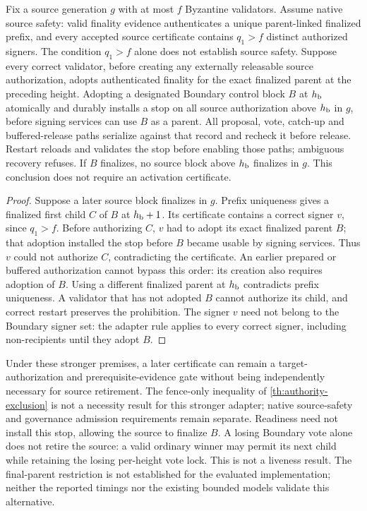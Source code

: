 \begin{proposition}
\label{prop:final-parent-retirement}
Fix a source generation $g$ with at most $f$ Byzantine validators. Assume native source safety:
valid finality evidence authenticates a unique parent-linked finalized prefix, and every accepted
source certificate contains $q_1>f$ distinct authorized signers. The condition $q_1>f$ alone does not establish source safety.
Suppose every correct validator, before creating any externally releasable source authorization,
adopts authenticated finality for the exact finalized parent at the preceding height.
Adopting a designated Boundary control block $B$ at $h_{\mathrm b}$ atomically and durably installs a stop on
all source authorization above $h_{\mathrm b}$ in $g$, before signing services can use $B$ as a parent.
All proposal, vote, catch-up and buffered-release paths serialize against that record and recheck
it before release. Restart reloads and validates the stop before enabling those paths; ambiguous
recovery refuses. If $B$ finalizes, no source block above $h_{\mathrm b}$ finalizes in $g$.
This conclusion does not require an activation certificate.
\end{proposition}
\begin{proof}
Suppose a later source block finalizes in $g$. Prefix uniqueness gives a finalized first child
$C$ of $B$ at $h_{\mathrm b}+1$. Its certificate contains a correct signer $v$, since $q_1>f$.
Before authorizing $C$, $v$ had to adopt its exact finalized parent $B$; that adoption installed
the stop before $B$ became usable by signing services. Thus $v$ could not authorize $C$,
contradicting the certificate. An earlier prepared or buffered authorization cannot bypass this
order: its creation also requires adoption of $B$. Using a different finalized parent at $h_{\mathrm b}$
contradicts prefix uniqueness. A validator that has not adopted $B$ cannot authorize its child,
and correct restart preserves the prohibition. The signer $v$ need not belong to the Boundary signer set:
the adapter rule applies to every correct signer, including non-recipients until they adopt $B$.
\end{proof}

\begin{remark}
Under these stronger premises, a later certificate can remain a target-authorization and
prerequisite-evidence gate without being independently necessary for source retirement.
The fence-only inequality of \cref{th:authority-exclusion} is not a necessity result for this stronger adapter;
native source-safety and governance admission requirements remain separate.
Readiness need not install this stop, allowing the source to finalize $B$.
A losing Boundary vote alone does not retire the source: a valid ordinary winner may permit
its next child while retaining the losing per-height vote lock. This is not a liveness result.
The final-parent restriction is not established for the evaluated implementation;
neither the reported timings nor the existing bounded models validate this alternative.
\end{remark}

